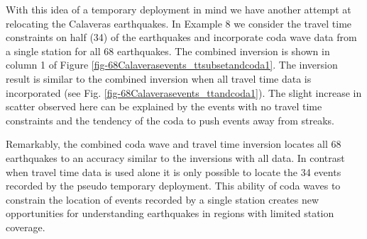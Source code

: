 \documentclass[extra, onecolumn, doublespacing]{gji}
\begin{document}
With this idea of a temporary deployment in mind we have another
attempt at relocating the Calaveras earthquakes. In Example 8 we
consider the travel time constraints on half (34) of the earthquakes
and incorporate coda wave data from a single station for all 68
earthquakes. The combined inversion is shown in column 1 of Figure
\ref{fig-68Calaverasevents_ttsubsetandcoda1}. The inversion result
is similar to the combined inversion when all travel time data is
incorporated (see Fig. \ref{fig-68Calaverasevents_ttandcoda1}). The
slight increase in scatter observed here can be explained by the
events with no travel time constraints and the tendency of the coda
to push events away from streaks.

Remarkably, the combined coda wave and travel time inversion locates
all 68 earthquakes to an accuracy similar to the inversions with all
data. In contrast when travel time data is used alone it is only
possible to locate the 34 events recorded by the pseudo temporary
deployment. This
ability of  coda waves to constrain the location of events recorded
by a single station creates new opportunities for understanding
earthquakes in regions with limited station coverage.

\end{document}
